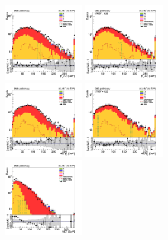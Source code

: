 \begin{figure}[tbp]
  \begin{center}
    \includegraphics[width=0.31\textwidth]{figures/ee_300_april18/hpt0_ee_CRDY_prefit_plot_apr18.png}
    \includegraphics[width=0.31\textwidth]{figures/ee_300_april18/hpt0_ee_CRDY_FullPostfit_plot_apr18.png}\\
    \includegraphics[width=0.31\textwidth]{figures/ee_300_april18/hpt1_ee_CRDY_prefit_plot_apr18.png}
    \includegraphics[width=0.31\textwidth]{figures/ee_300_april18/hpt1_ee_CRDY_FullPostfit_plot_apr18.png}\\
    \includegraphics[width=0.31\textwidth]{figures/ee_300_april18/met_pt_ee_CRDY_prefit_plot_apr18.png}

\end{center}
\end{figure}
